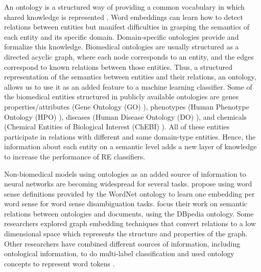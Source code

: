 An ontology is a structured way of providing a common vocabulary in which shared knowledge is represented \citep{gruber1993translation}. Word embeddings can learn how to detect relations between entities but manifest difficulties in grasping the semantics of each entity and its specific domain. Domain-specific ontologies provide and formalize this knowledge. Biomedical ontologies are usually structured as a directed acyclic graph, where each node corresponds to an entity, and the edges correspond to known relations between those entities. Thus, a structured representation of the semantics between entities and their relations, an ontology, allows us to use it as an added feature to a machine learning classifier. Some of the biomedical entities structured in publicly available ontologies are genes properties/attributes (Gene Ontology (GO) \citep{ashburner2000gene}), phenotypes (Human Phenotype Ontology (HPO) \citep{robinson2010human}), diseases (Human Disease Ontology (DO) \citep{schriml2012disease}), and chemicals (Chemical Entities of Biological Interest (ChEBI) \citep{hastings2016chebi}). All of these entities participate in relations with different and same domain-type entities. Hence, the information about each entity on a semantic level adds a new layer of knowledge to increase the performance of RE classifiers. 

Non-biomedical models using ontologies as an added source of information to neural networks are becoming widespread for several tasks. \cite{li2016learning} propose using word sense definitions provided by the WordNet ontology to learn one embedding per word sense for word sense disambiguation tasks. \cite{ma2017ontology} focus their work on semantic relations between ontologies and documents, using the DBpedia ontology. Some researchers explored graph embedding techniques \citep{goyal2018graph} that convert relations to a low dimensional space which represents the structure and properties of the graph. Other researchers have combined different sources of information, including ontological information, to do multi-label classification \citep{kong2013multi} and used ontology concepts to represent word tokens \citep{dasigi2017ontology}.

